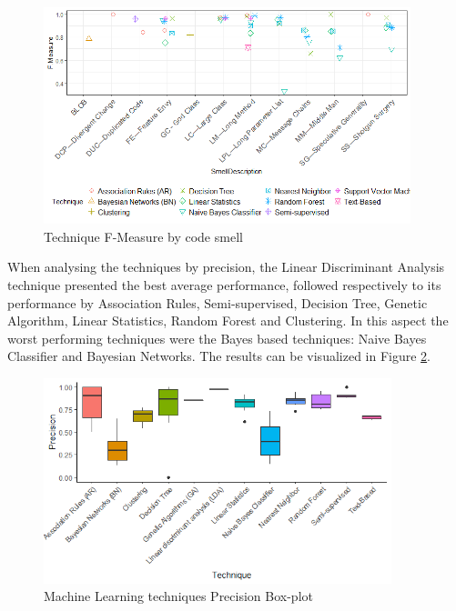 \begin{figure}[!ht] 
    \centering
	\caption{Technique F-Measure by code smell}
	\label{fig:techniqueXSmellFMeasure}
	\includegraphics[width=0.95\textwidth]{imagens/TechniqueXSmellFMeasure.png}
\end{figure}

When analysing the techniques by precision, the Linear Discriminant Analysis technique presented the best average performance, followed respectively to its performance by Association Rules, Semi-supervised, Decision Tree, Genetic Algorithm, Linear Statistics, Random Forest and Clustering. In this aspect the worst performing techniques were the Bayes based techniques: Naive Bayes Classifier and Bayesian Networks. The results can be visualized in Figure \ref{fig:precisionByTechniques}.

\begin{figure}[!ht] 
    \centering
	\caption{Machine Learning techniques Precision Box-plot}
	\label{fig:precisionByTechniques}
	\includegraphics[width=0.9\textwidth]{imagens/precisionByTechniques.png}
\end{figure}

